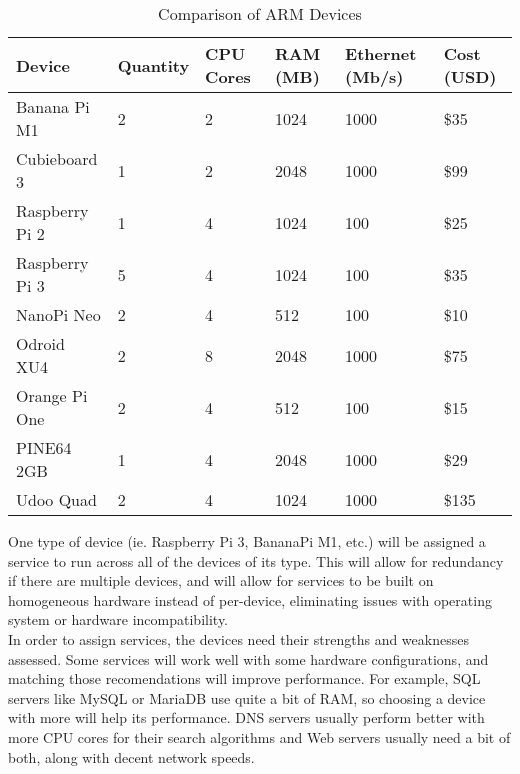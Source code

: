 \documentclass[12pt]{spieman}  %
\begin{document}
\begin{table}[ht]
\caption{Comparison of ARM Devices} 
\label{tab:device-analysis}
\begin{center}       
\begin{tabular}{|l|l|l|l|l|l|}
\hline
\rule[-1ex]{0pt}{3.5ex}  Device & Quantity & CPU Cores & RAM (MB) & Ethernet (Mb/s) & Cost (USD) \\
\hline\hline
\rule[-1ex]{0pt}{3.5ex}  Banana Pi M1 & 2 & 2 & 1024 & 1000 & \$35  \\
\hline
\rule[-1ex]{0pt}{3.5ex}  Cubieboard 3 & 1 & 2 & 2048 & 1000 & \$99  \\
\hline
\rule[-1ex]{0pt}{3.5ex}  Raspberry Pi 2 & 1 & 4 & 1024 & 100 & \$25 \\
\hline
\rule[-1ex]{0pt}{3.5ex}  Raspberry Pi 3 & 5 & 4 & 1024 & 100 & \$35 \\
\hline
\rule[-1ex]{0pt}{3.5ex}  NanoPi Neo & 2 & 4 & 512 & 100 & \$10      \\
\hline
\rule[-1ex]{0pt}{3.5ex}  Odroid XU4 & 2 & 8 & 2048 & 1000 & \$75    \\
\hline
\rule[-1ex]{0pt}{3.5ex}  Orange Pi One & 2 & 4 & 512 & 100 & \$15   \\
\hline
\rule[-1ex]{0pt}{3.5ex}  PINE64 2GB & 1 & 4 & 2048 & 1000 & \$29    \\
\hline
\rule[-1ex]{0pt}{3.5ex}  Udoo Quad & 2 & 4 & 1024 & 1000 & \$135    \\
\hline
\end{tabular}
\end{center}
\end{table} 

One type of device (ie. Raspberry Pi 3, BananaPi M1, etc.) will be assigned a service to run across all of the devices of its type. This will allow for redundancy if there are multiple devices, and will allow for services to be built on homogeneous hardware instead of per-device, eliminating issues with operating system or hardware incompatibility.\\

In order to assign services, the devices need their strengths and weaknesses assessed. Some services will work well with some hardware configurations, and matching those recomendations will improve performance. For example, SQL servers like MySQL or MariaDB use quite a bit of RAM, so choosing a device with more will help its performance. DNS servers usually perform better with more CPU cores for their search algorithms and Web servers usually need a bit of both, along with decent network speeds.
\end{document}
